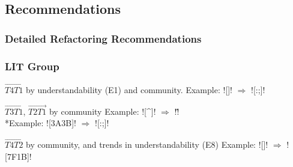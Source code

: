 \subsection{Recommendations}

{
\begin{frame}
\frametitle{Detailed Refactoring Recommendations}
\end{frame}
}
\note[itemize]{
    \item
}


\begin{frame}[fragile]
\frametitle{LIT Group}
\begin{block}{$\overrightarrow{T4 T1}$ by understandability (E1) and community.}
Example: \cverb![]! $\Rightarrow$ \cverb![:;]!
\end{block}

\begin{block}{$\overrightarrow{T3 T1}$, $\overrightarrow{T2 T1}$ by community}
Example: \cverb![^]! $\Rightarrow$ \cverb!\^!
\\*Example: \cverb![\x3A\x3B]! $\Rightarrow$ \cverb![:;]!
\end{block}

\begin{block}{$\overrightarrow{T4 T2}$ by community, and trends in understandability (E8) }
Example: \cverb![]! $\Rightarrow$ \cverb![\x7F\x1B]!
\end{block}

\end{frame}


